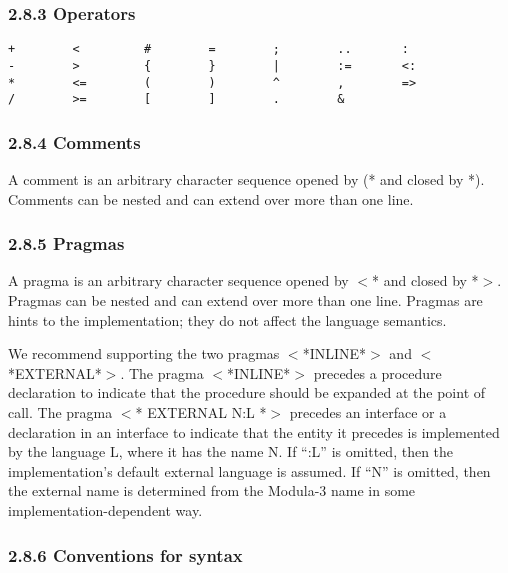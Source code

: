 \documentclass[10pt]{article}
\begin{document}
 
\subsubsection*{2.8.3 Operators}


 
\begin{verbatim}
+        <         #        =        ;        ..       :
-        >         {        }        |        :=       <:
*        <=        (        )        ^        ,        =>
/        >=        [        ]        .        &
\end{verbatim}



 
\subsubsection*{2.8.4 Comments}


  A comment is an arbitrary character sequence opened by (* and closed by *). Comments can be nested and can extend over more than one line. 


 
\subsubsection*{2.8.5 Pragmas}


  A pragma is an arbitrary character sequence opened by $<$* and closed by *$>$. Pragmas can be nested and can extend over more than one line. Pragmas are hints to the implementation; they do not affect the language semantics. 


 We recommend supporting the two pragmas $<$*INLINE*$>$ and $<$*EXTERNAL*$>$. The pragma $<$*INLINE*$>$ precedes a procedure declaration to indicate that the procedure should be expanded at the point of call. The pragma $<$* EXTERNAL N:L *$>$ precedes an interface or a declaration in an interface to indicate that the entity it precedes is implemented by the language L, where it has the name N. If ``:L'' is omitted, then the implementation's default external language is assumed. If ``N'' is omitted, then the external name is determined from the Modula-3 name in some implementation-dependent way. 


 
\subsubsection*{2.8.6 Conventions for syntax}
\end{document}
